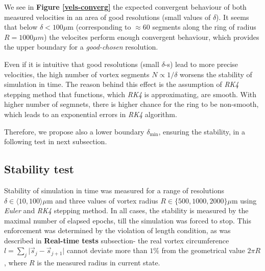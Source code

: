 We see in \textbf{Figure \ref{vels-converg}} the expected convergent behaviour of both measured velocities in an area of good resolutions (small values of $\delta$). It seems that below $ \delta < 100 \mu\text{m}$  (corresponding to $\approx 60$ segments along the ring of radius $R=1000 \mu \unit{m}$) the velocites perform enough convergent behaviour, which provides the upper boundary for a \textit{good-chosen} resolution.

Even if it is intuitive that good resolutions (small $\delta$-s) lead to more precise velocities, the high number of vortex segments $N \propto 1/\delta$ worsens the stability of simulation in time. The reason behind this effect is the assumption of \textit{RK4} stepping method that functions, which \textit{RK4} is approximating, are smooth. With higher number of segmnets, there is higher chance for the ring to be non-smooth, which leads to an exponential errors in \textit{RK4} algorithm.

Therefore, we propose also a lower boundary $\delta_{\text{min}}$, ensuring the stability, in a following test in next subsection.


\subsection*{Stability test}

Stability of simulation in time was measured for a range of resolutions $\delta \in \langle 10, 100 \rangle \mu\text{m}$ and three values of vortex radius $R \in \{500, 1000, 2000\} \mu\text{m}$ using \textit{Euler} and \textit{RK4} stepping method. In all cases, the stability is measured by the maximal number of elapsed epochs, till the simulation was forced to stop.
This enforcement was determined by the violation of length condition, as was described in \textbf{Real-time tests} subsection- the real vortex circumference $l = \sum_j \vert \vec{s}_j - \vec{s}_{j+1} \vert$ cannot deviate more than $1\%$ from the geometrical value $2\pi R$, where $R$ is the measured radius in current state.

